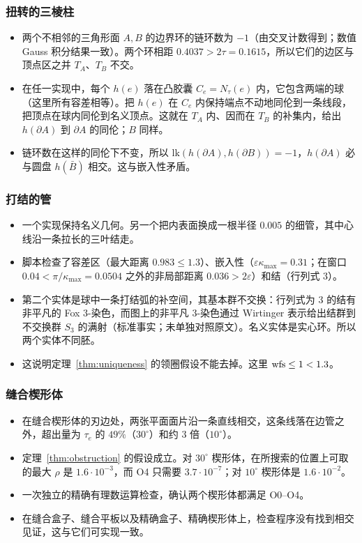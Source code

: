 \subsubsection*{扭转的三棱柱}
\begin{itemize}
\item 两个不相邻的三角形面 $A,B$ 的边界环的链环数为 $-1$（由交叉计数得到；数值 Gauss 积分结果一致）。两个环相距 $0.4037>2\tau=0.1615$，所以它们的边区与顶点区之并 $T_A$、$T_B$ 不交。
\item 在任一实现中，每个 $h(e)$ 落在凸胶囊 $C_e=N_\tau(e)$ 内，它包含两端的球（这里所有容差相等）。把 $h(e)$ 在 $C_e$ 内保持端点不动地同伦到一条线段，把顶点在球内同伦到名义顶点。这就在 $T_A$ 内、因而在 $T_B$ 的补集内，给出 $h(\partial A)$ 到 $\partial A$ 的同伦；$B$ 同样。
\item 链环数在这样的同伦下不变，所以 $\mathrm{lk}(h(\partial A),h(\partial B))=-1$，$h(\partial A)$ 必与圆盘 $h(\bar B)$ 相交。这与嵌入性矛盾。
\end{itemize}

\subsubsection*{打结的管}
\begin{itemize}
\item 一个实现保持名义几何。另一个把内表面换成一根半径 $0.005$ 的细管，其中心线沿一条拉长的三叶结走。
\item 脚本检查了容差区（最大距离 $0.983\le1.3$）、嵌入性（$\varepsilon\kappa_{\max}=0.31$；在窗口 $0.04<\pi/\kappa_{\max}=0.0504$ 之外的非局部距离 $0.036>2\varepsilon$）和结（行列式 $3$）。
\item 第二个实体是球中一条打结弧的补空间，其基本群不交换：行列式为 $3$ 的结有非平凡的 Fox 3-染色，而图上的非平凡 3-染色通过 Wirtinger 表示给出结群到不交换群 $S_3$ 的满射（标准事实；未单独对照原文）。名义实体是实心环。所以两个实体不同胚。
\item 这说明定理~\ref{thm:uniqueness} 的领圈假设不能去掉。这里 $\operatorname{wfs}\le1<1.3$。
\end{itemize}

\subsubsection*{缝合楔形体}
\begin{itemize}
\item 在缝合楔形体的刃边处，两张平面面片沿一条直线相交，这条线落在边管之外，超出量为 $\tau_e$ 的 $49\%$（$30^\circ$）和约 $3$ 倍（$10^\circ$）。
\item 定理~\ref{thm:obstruction} 的假设成立。对 $30^\circ$ 楔形体，在所搜索的位置上可取的最大 $\rho$ 是 $1.6\cdot10^{-3}$，而 O4 只需要 $3.7\cdot10^{-7}$；对 $10^\circ$ 楔形体是 $1.6\cdot10^{-2}$。
\item 一次独立的精确有理数运算检查，确认两个楔形体都满足 O0--O4。
\item 在缝合盒子、缝合平板以及精确盒子、精确楔形体上，检查程序没有找到相交见证，这与它们可实现一致。
\end{itemize}

